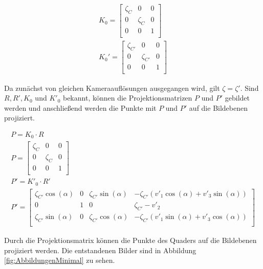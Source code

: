\begin{gather}		
K_0 =
\begin{bmatrix}
\zeta_{C}&0&0\\
0&\zeta_{C}&0\\
0&0&1\\
\end{bmatrix}\label{eq:eq4.9}\\
K_0' =
\begin{bmatrix}
\zeta_{C'}&0&0\\
0&\zeta_{C'}&0\\
0&0&1\\
\end{bmatrix}\label{eq:eq4.10}
\end{gather}

Da zunächst von gleichen Kameraauflösungen ausgegangen wird, gilt $\zeta = \zeta'$. Sind $R,R',K_0$ und $K'_0$ bekannt, können die Projektionsmatrizen $P$ und $P'$ gebildet werden und anschließend werden die Punkte mit $P$ und $P'$ auf die Bildebenen projiziert.


\begin{gather}
P = K_0\cdot R \\
P =
\begin{bmatrix}
\zeta_{C}&0&0\\
0&\zeta_{C}&0\\
0&0&1\\
\end{bmatrix}\\
P' = K'_0 \cdot R'\\
P' =
\begin{bmatrix}
\zeta_{C'} \cos(\alpha)&0&\zeta_{C'} \sin(\alpha)&-\zeta_{C'} (v'_1\cos(\alpha)+v'_3\sin(\alpha) )\\
0&1&0&\zeta_{C'}-v'_2\\
\zeta_{C'}\sin(\alpha)&0&\zeta_{C'}\cos(\alpha)&-\zeta_{C'}(v'_1\sin(\alpha)+v'_3\cos(\alpha))\\
\end{bmatrix}
\end{gather}



%
Durch die Projektionsmatrix können die Punkte des Quaders auf die Bildebenen projiziert werden. Die entstandenen Bilder sind in Abbildung \ref{fig:AbbildungenMinimal} zu sehen. 


